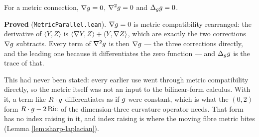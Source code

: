 \begin{lemma}
  \label{lem:metric-parallel}
  \leanok
  For a metric connection, $\nabla g = 0$, $\nabla^2 g = 0$ and $\Delta_g g = 0$.

  \textbf{Proved} (\texttt{MetricParallel.lean}). $\nabla g = 0$ is metric compatibility
  rearranged: the derivative of $\langle Y,Z\rangle$ is $\langle \nabla Y,Z\rangle + \langle
  Y,\nabla Z\rangle$, which are exactly the two corrections $\nabla g$ subtracts. Every term of
  $\nabla^2g$ is then $\nabla g$ --- the three corrections directly, and the leading one because
  it differentiates the zero function --- and $\Delta_gg$ is the trace of that.

  This had never been stated: every earlier use went through metric compatibility directly,
  so the metric itself was not an input to the bilinear-form calculus. With it, a term like
  $R\cdot g$ differentiates as if $g$ were constant, which is what the $(0,2)$ form
  $R\cdot g - 2\operatorname{Ric}$ of the dimension-three curvature operator needs. That form has no index
  raising in it, and index raising is where the moving fibre metric bites
  (Lemma \ref{lem:sharp-laplacian}).
\end{lemma}

